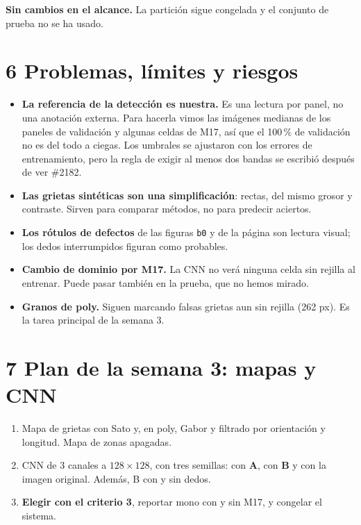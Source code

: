 \documentclass[10pt,a4paper]{article}
\begin{document}
\textbf{Sin cambios en el alcance.} La partición sigue congelada y el conjunto de prueba no se ha usado.

\section*{6 \quad Problemas, límites y riesgos}

\begin{itemize}[leftmargin=14pt]
  \item \textbf{La referencia de la detección es nuestra.} Es una lectura por panel, no una anotación externa. Para hacerla vimos las imágenes medianas de los paneles de
        validación y algunas celdas de M17, así que el 100\,\% de validación no es del todo a ciegas. Los umbrales se ajustaron con los errores de entrenamiento, pero la
        regla de exigir al menos dos bandas se escribió después de ver \#2182.
  \item \textbf{Las grietas sintéticas son una simplificación}: rectas, del mismo grosor y contraste. Sirven para comparar métodos, no para predecir aciertos.
  \item \textbf{Los rótulos de defectos} de las figuras \texttt{b0} y de la página son lectura visual; los dedos interrumpidos figuran como probables.
  \item \textbf{Cambio de dominio por M17.} La CNN no verá ninguna celda sin rejilla al entrenar. Puede pasar también en la prueba, que no hemos mirado.
  \item \textbf{Granos de poly.} Siguen marcando falsas grietas aun sin rejilla (262 px). Es la tarea principal de la semana 3.
\end{itemize}

\section*{7 \quad Plan de la semana 3: mapas y CNN}

\begin{enumerate}[leftmargin=16pt]
  \item Mapa de grietas con Sato y, en poly, Gabor y filtrado por orientación y longitud. Mapa de zonas apagadas.
  \item CNN de 3 canales a $128\times128$, con tres semillas: con \textbf{A}, con \textbf{B} y con la imagen original. Además, B con y sin dedos.
  \item \textbf{Elegir con el criterio 3}, reportar mono con y sin M17, y congelar el sistema.
\end{enumerate}
\end{document}
